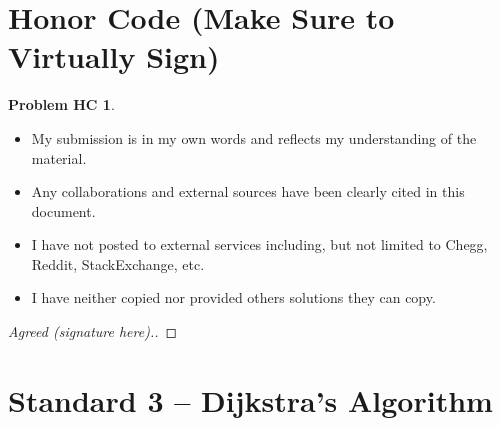 \documentclass[11pt]{article}
\theoremstyle{definition}
\theoremstyle{definition}
\newtheorem*{requiredHC}{Problem HC}
\theoremstyle{definition}
\begin{document}
\section*{Honor Code (Make Sure to Virtually Sign)} \label{HonorCode}
\hypertarget{HonorCode}{}

\begin{requiredHC}
\begin{itemize}
\item My submission is in my own words and reflects my understanding of the material.
\item Any collaborations and external sources have been clearly cited in this document.
\item I have not posted to external services including, but not limited to Chegg, Reddit, StackExchange, etc.
\item I have neither copied nor provided others solutions they can copy.
\end{itemize}

\end{requiredHC}

\begin{proof}[Agreed (signature here).]
\end{proof}


\newpage
\setcounter{section}{2}
\section{Standard 3 -- Dijkstra's Algorithm}
\end{document}
